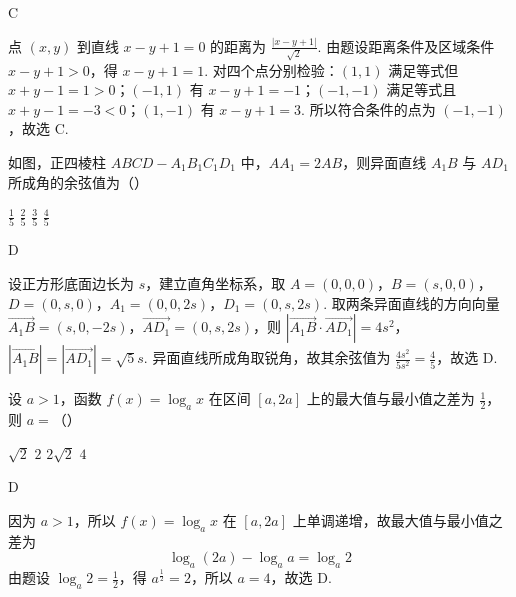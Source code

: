 \begin{answer}
C
\end{answer}

\begin{solution}
点 \((x,y)\) 到直线 \(x-y+1=0\) 的距离为 \(\frac{|x-y+1|}{\sqrt{2}}\). 由题设距离条件及区域条件 \(x-y+1>0\)，得 \(x-y+1=1\). 对四个点分别检验：\((1,1)\) 满足等式但 \(x+y-1=1>0\)；\((-1,1)\) 有 \(x-y+1=-1\)；\((-1,-1)\) 满足等式且 \(x+y-1=-3<0\)；\((1,-1)\) 有 \(x-y+1=3\). 所以符合条件的点为 \((-1,-1)\)，故选 C.
\end{solution}

\begin{problem}
如图，正四棱柱 \(ABCD-A_{1}B_{1}C_{1}D_{1}\) 中，\(AA_{1} = 2AB\)，则异面直线 \(A_{1}B\) 与 \(AD_{1}\) 所成角的余弦值为（\quad）


\choices
    {\(\frac{1}{5}\)}
    {\(\frac{2}{5}\)}
    {\(\frac{3}{5}\)}
    {\(\frac{4}{5}\)}
\end{problem}

\begin{answer}
D
\end{answer}

\begin{solution}
设正方形底面边长为 \(s\)，建立直角坐标系，取 \(A=(0,0,0)\)，\(B=(s,0,0)\)，\(D=(0,s,0)\)，\(A_{1}=(0,0,2s)\)，\(D_{1}=(0,s,2s)\). 取两条异面直线的方向向量 \(\overrightarrow{A_{1}B}=(s,0,-2s)\)，\(\overrightarrow{AD_{1}}=(0,s,2s)\)，则
\(\left|\overrightarrow{A_{1}B}\cdot\overrightarrow{AD_{1}}\right|=4s^2\)，\(|\overrightarrow{A_{1}B}|=|\overrightarrow{AD_{1}}|=\sqrt{5}s\).
异面直线所成角取锐角，故其余弦值为 \(\frac{4s^2}{5s^2}=\frac45\)，故选 D.
\end{solution}

\begin{problem}
设 \(a > 1\)，函数 \(f(x) = \log_a x\) 在区间 \([a, 2a]\) 上的最大值与最小值之差为 \(\frac{1}{2}\)，则 \(a =\)（\quad）

\choices
    {\(\sqrt{2}\)}
    {\(2\)}
    {\(2 \sqrt{2}\)}
    {\(4\)}
\end{problem}

\begin{answer}
D
\end{answer}

\begin{solution}
因为 \(a>1\)，所以 \(f(x)=\log_a x\) 在 \([a,2a]\) 上单调递增，故最大值与最小值之差为
\[
\log_a(2a)-\log_a a=\log_a2
\]
由题设 \(\log_a2=\frac12\)，得 \(a^{\frac{1}{2}}=2\)，所以 \(a=4\)，故选 D.
\end{solution}


